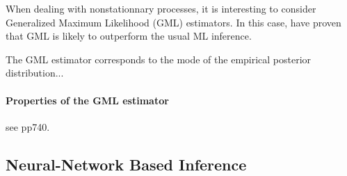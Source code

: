 \documentclass[11pt,a4paper,openany ]{book}
\begin{document}
When dealing with nonstationnary processes, it is interesting to consider Generalized Maximum Likelihood (GML) estimators. In this case, \cite{Adlouni_generalized_2007} have proven that GML is likely to outperform the usual ML inference.

The GML estimator corresponds to the mode of the empirical posterior distribution...

\paragraph*{Properties of the GML estimator} see pp740. \citet{martin_generalized_2000}

\subsection{Neural-Network Based Inference}
\end{document}
